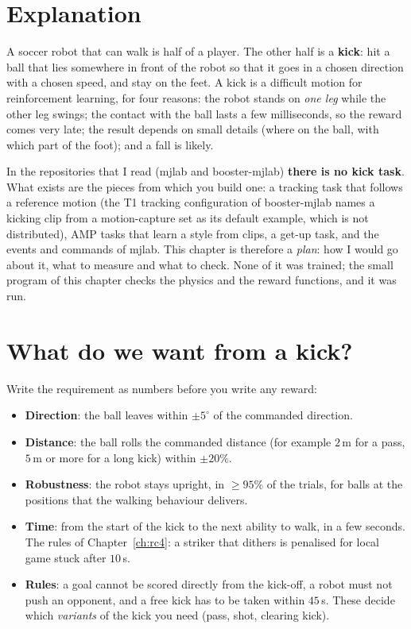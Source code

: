 \label{ch:mj4}

\section*{Explanation}
A soccer robot that can walk is half of a player. The other half is a \textbf{kick}: hit a ball that lies somewhere in front of the robot so that it goes in a chosen direction with a chosen speed, and stay on the feet. A kick is a difficult motion for reinforcement learning, for four reasons: the robot stands on \emph{one leg} while the other leg swings; the contact with the ball lasts a few milliseconds, so the reward comes very late; the result depends on small details (where on the ball, with which part of the foot); and a fall is likely.

\begin{keyidea}
In the repositories that I read (mjlab and booster-mjlab) \textbf{there is no kick task}. What exists are the pieces from which you build one: a tracking task that follows a reference motion (the T1 tracking configuration of booster-mjlab names a kicking clip from a motion-capture set as its default example, which is not distributed), AMP tasks that learn a style from clips, a get-up task, and the events and commands of mjlab. This chapter is therefore a \emph{plan}: how I would go about it, what to measure and what to check. None of it was trained; the small program of this chapter checks the physics and the reward functions, and it was run.
\end{keyidea}

\section*{What do we want from a kick?}
Write the requirement as numbers before you write any reward:
\begin{itemize}[nosep]
 \item \textbf{Direction}: the ball leaves within $\pm5^{\circ}$ of the commanded direction.
 \item \textbf{Distance}: the ball rolls the commanded distance (for example $2$\,m for a pass, $5$\,m or more for a long kick) within $\pm20\%$.
 \item \textbf{Robustness}: the robot stays upright, in $\ge95\%$ of the trials, for balls at the positions that the walking behaviour delivers.
 \item \textbf{Time}: from the start of the kick to the next ability to walk, in a few seconds. The rules of Chapter~\ref{ch:rc4}: a striker that dithers is penalised for local game stuck after $10$\,s.
 \item \textbf{Rules}: a goal cannot be scored directly from the kick-off, a robot must not push an opponent, and a free kick has to be taken within $45$\,s. These decide which \emph{variants} of the kick you need (pass, shot, clearing kick).
\end{itemize}

